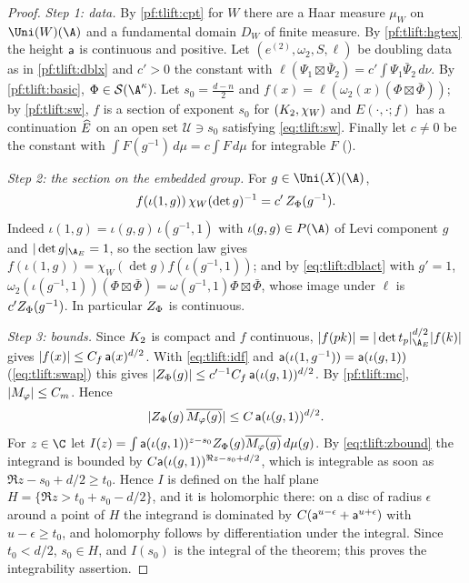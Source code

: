 \begin{proof}
\emph{Step 1: data.} By \cref{pf:tlift:cpt} for $W$ there are a Haar measure $\mu_W$ on $\Uni(W)(\A)$ and a
fundamental domain $D_W$ of finite measure. By \cref{pf:tlift:hgtex} the height $\mathsf{a}$ is continuous and
positive. Let $(e^{(2)},\omega_2,S,\ell)$ be doubling data as in \cref{pf:tlift:dblx} and $c'>0$ the constant with
$\ell(\Psi_1\boxtimes\bar\Psi_2)=c'\int\Psi_1\bar\Psi_2\,d\nu$. By \cref{pf:tlift:basic}, $\Phi\in\tliftS(\A^\kappa)$. Let
$s_0=\frac{d-n}2$ and $f(x)=\ell(\omega_2(x)(\Phi\boxtimes\bar\Phi))$; by \cref{pf:tlift:sw}, $f$ is a section of exponent
$s_0$ for $(K_2,\chi_W)$ and $E(\cdot,\cdot;f)$ has a continuation $\widehat{E}$ on an open set $\mathcal U\ni s_0$ satisfying
\eqref{eq:tlift:sw}. Finally let $c\ne0$ be the constant with $\int F(g^{-1})\,d\mu=c\int F\,d\mu$ for integrable
$F$ ().

\emph{Step 2: the section on the embedded group.} For $g\in\Uni(X)(\A)$,
\begin{equation}\label{eq:tlift:idf}
  f(\iota(1,g))\,\chi_W(\det g)^{-1}=c'\,Z_\Phi(g^{-1}).
\end{equation}
Indeed $\iota(1,g)=\iota(g,g)\,\iota(g^{-1},1)$ with $\iota(g,g)\in P(\A)$ of Levi component $g$ and
$|\det g|_{\tliftAE}=1$, so the section law gives $f(\iota(1,g))=\chi_W(\det g)f(\iota(g^{-1},1))$; and by
\eqref{eq:tlift:dblact} with $g'=1$, $\omega_2(\iota(g^{-1},1))(\Phi\boxtimes\bar\Phi)=\omega(g^{-1},1)\Phi\boxtimes\bar\Phi$, whose
image under $\ell$ is $c'Z_\Phi(g^{-1})$. In particular $Z_\Phi$ is continuous.

\emph{Step 3: bounds.} Since $K_2$ is compact and $f$ continuous, $|f(pk)|=|\det t_p|_{\tliftAE}^{d/2}|f(k)|$ gives
$|f(x)|\le C_f\,\mathsf{a}(x)^{d/2}$. With \eqref{eq:tlift:idf} and
$\mathsf{a}(\iota(1,g^{-1}))=\mathsf{a}(\iota(g,1))$ (\eqref{eq:tlift:swap}) this gives
$|Z_\Phi(g)|\le c'^{-1}C_f\,\mathsf{a}(\iota(g,1))^{d/2}$. By \cref{pf:tlift:mc}, $|M_\varphi|\le C_m$. Hence
\begin{equation}\label{eq:tlift:zbound}
  |Z_\Phi(g)\,\overline{M_\varphi(g)}|\le C\,\mathsf{a}(\iota(g,1))^{d/2}.
\end{equation}
For $z\in\C$ let $I(z)=\int\mathsf{a}(\iota(g,1))^{z-s_0}Z_\Phi(g)\overline{M_\varphi(g)}\,d\mu(g)$. By
\eqref{eq:tlift:zbound} the integrand is bounded by $C\mathsf{a}(\iota(g,1))^{\Re z-s_0+d/2}$, which is integrable as soon as
$\Re z-s_0+d/2\ge t_0$. Hence $I$ is defined on the half plane $H=\{\Re z>t_0+s_0-d/2\}$, and it is holomorphic
there: on a disc of radius $\epsilon$ around a point of $H$ the integrand is dominated by
$C(\mathsf{a}^{u-\epsilon}+\mathsf{a}^{u+\epsilon})$ with $u-\epsilon\ge t_0$, and holomorphy follows by differentiation under the
integral. Since $t_0<d/2$, $s_0\in H$, and $I(s_0)$ is the integral
of the theorem; this proves the integrability assertion.


\end{proof}
